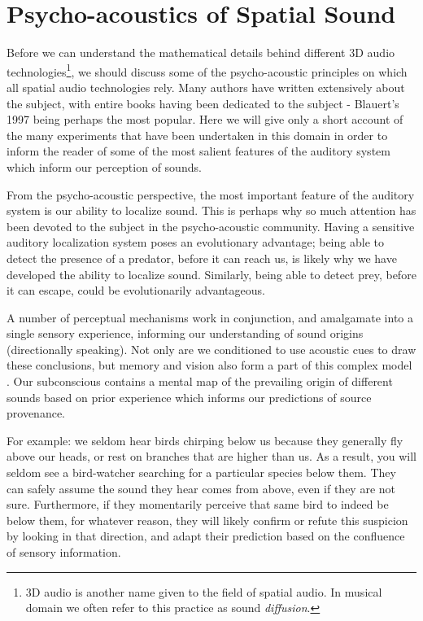 \section{Psycho-acoustics of Spatial Sound}

Before we can understand the mathematical details behind different 3D audio technologies\footnote{3D audio is another name given to the field of spatial audio. In musical domain we often refer to this practice as sound \textit{diffusion}.}, we should discuss some of the psycho-acoustic principles on which all spatial audio technologies rely. Many authors have written extensively about the subject, with entire books having been dedicated to the subject - Blauert's 1997 \cite{blauert1997spatial} being perhaps the most popular. Here we will give only a short account of the many experiments that have been undertaken in this domain in order to inform the reader of some of the most salient features of the auditory system which inform our perception of sounds.

From the psycho-acoustic perspective, the most important feature of the auditory system is our ability to localize sound. This is perhaps why so much attention has been devoted to the subject in the psycho-acoustic community. Having a sensitive auditory localization system poses an evolutionary advantage; being able to detect the presence of a predator, before it can reach us, is likely why we have developed the ability to localize sound. Similarly, being able to detect prey, before it can escape, could be evolutionarily advantageous. 

A number of perceptual mechanisms work in conjunction, and amalgamate into a single sensory experience, informing our understanding of sound origins (directionally speaking). Not only are we conditioned to use acoustic cues to draw these conclusions, but memory and vision also form a part of this complex model \cite{kendall19953}. Our subconscious contains a mental map of the prevailing origin of different sounds based on prior experience which informs our predictions of source provenance. 

For example: we seldom hear birds chirping below us because they generally fly above our heads, or rest on branches that are higher than us. As a result, you will seldom see a bird-watcher searching for a particular species below them. They can safely assume the sound they hear comes from above, even if they are not sure. Furthermore, if they momentarily perceive that same bird to indeed be below them, for whatever reason, they will likely confirm or refute this suspicion by looking in that direction, and adapt their prediction based on the confluence of sensory information. 

